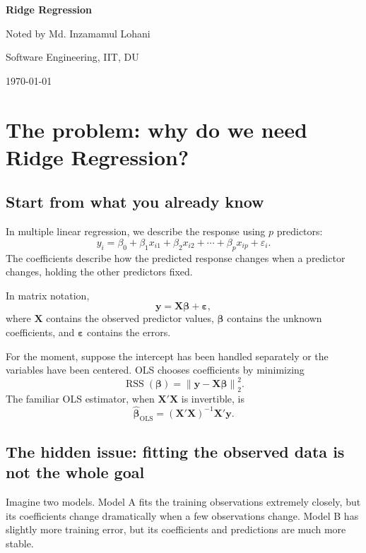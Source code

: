 \documentclass[11pt,a4paper]{article}
\numberwithin{equation}{section}
\theoremstyle{remark}
\newcommand{\topicname}{Ridge Regression}
\newcommand{\X}{\mathbf X}
\newcommand{\y}{\mathbf y}
\newcommand{\bta}{\boldsymbol{\beta}}
\newcommand{\bhat}{\widehat{\boldsymbol{\beta}}}
\newcommand{\RSS}{\operatorname{RSS}}
\newcommand{\norm}[1]{\left\lVert #1\right\rVert_2}
\begin{document}
\begin{titlepage}
  \centering
  \vspace*{\fill}
  {\Huge\bfseries \topicname\par}
  \vspace{2.5em}
  {\large Noted by Md. Inzamamul Lohani\par}
  \vspace{0.4em}
  {\large Software Engineering, IIT, DU\par}
  \vspace{2em}
  {\large \today\par}
  \vspace*{\fill}
\end{titlepage}

\setcounter{page}{2}
\tableofcontents
\newpage

\section{The problem: why do we need Ridge Regression?}

\subsection{Start from what you already know}
In multiple linear regression, we describe the response using $p$ predictors:
\[
y_i=\beta_0+\beta_1x_{i1}+\beta_2x_{i2}+\cdots+\beta_px_{ip}
+\varepsilon_i.
\]
The coefficients describe how the predicted response changes when a
predictor changes, holding the other predictors fixed.

In matrix notation,
\[
\boxed{\y=\X\bta+\boldsymbol{\varepsilon}},
\]
where $\X$ contains the observed predictor values, $\bta$ contains the
unknown coefficients, and $\boldsymbol{\varepsilon}$ contains the errors.

For the moment, suppose the intercept has been handled separately or the
variables have been centered. OLS chooses coefficients by minimizing
\[
\boxed{\RSS(\bta)=\norm{\y-\X\bta}^2.}
\]
The familiar OLS estimator, when $\X'\X$ is invertible, is
\[
\boxed{\bhat_{\mathrm{OLS}}=(\X'\X)^{-1}\X'\y.}
\]

\subsection{The hidden issue: fitting the observed data is not the whole goal}
Imagine two models. Model A fits the training observations extremely closely,
but its coefficients change dramatically when a few observations change.
Model B has slightly more training error, but its coefficients and predictions
are much more stable.
\end{document}
